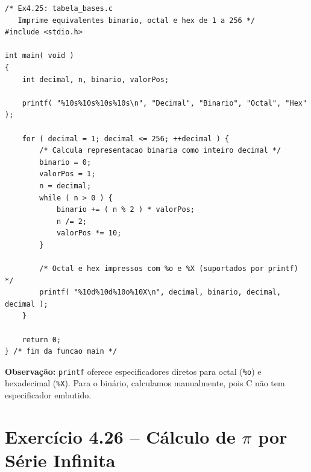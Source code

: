 \documentclass[12pt,a4paper]{article}
\begin{document}
\begin{respostabox}
\begin{lstlisting}
/* Ex4.25: tabela_bases.c
   Imprime equivalentes binario, octal e hex de 1 a 256 */
#include <stdio.h>

int main( void )
{
    int decimal, n, binario, valorPos;

    printf( "%10s%10s%10s%10s\n", "Decimal", "Binario", "Octal", "Hex" );

    for ( decimal = 1; decimal <= 256; ++decimal ) {
        /* Calcula representacao binaria como inteiro decimal */
        binario = 0;
        valorPos = 1;
        n = decimal;
        while ( n > 0 ) {
            binario += ( n % 2 ) * valorPos;
            n /= 2;
            valorPos *= 10;
        }

        /* Octal e hex impressos com %o e %X (suportados por printf) */
        printf( "%10d%10d%10o%10X\n", decimal, binario, decimal, decimal );
    }

    return 0;
} /* fim da funcao main */
\end{lstlisting}

\textbf{Observação:} \texttt{printf} oferece especificadores diretos para octal
(\texttt{\%o}) e hexadecimal (\texttt{\%X}). Para o binário, calculamos manualmente,
pois C não tem especificador embutido.
\end{respostabox}

\section{Exercício 4.26 -- Cálculo de $\pi$ por Série Infinita}
\end{document}

